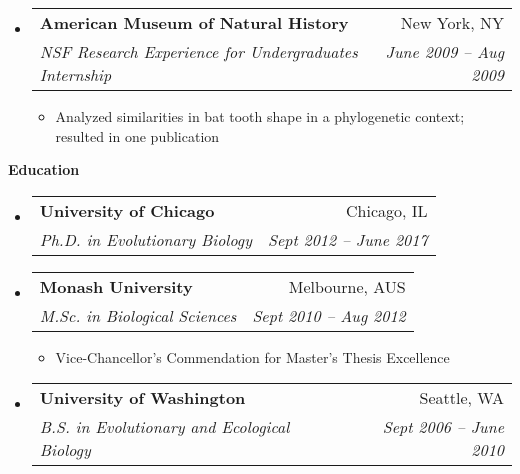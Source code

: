 \documentclass[letterpaper,11pt]{article}
\makeatletter
\newcommand{\resitem}[1]{\item #1 \vspace{-2pt}}
\newcommand{\resheading}[1]{{\large \colorbox{mygrey}{\begin{minipage}{\textwidth}{\textbf{#1 \vphantom{p\^{E}}}}\end{minipage}}}}
\newcommand{\ressubheading}[4]{
\begin{tabular*}{6.5in}{l@{\extracolsep{\fill}}r}
		\textbf{#1} & #2 \\
		\textit{#3} & \textit{#4} \\
\end{tabular*}\vspace{-6pt}}
\makeatother
\begin{document}
\begin{itemize}
    \item 
      \ressubheading{American Museum of Natural History}{New York, NY}{NSF Research Experience for Undergraduates Internship}{June 2009 -- Aug 2009}
        { \footnotesize
        \begin{itemize}
            \resitem{Analyzed similarities in bat tooth shape in a phylogenetic context; resulted in one publication }
        \end{itemize}
        }
	\end{itemize}  %

\resheading{Education}
	\begin{itemize}
		\item
      \ressubheading{University of Chicago}{Chicago, IL}{Ph.D. in Evolutionary Biology}{Sept 2012 -- June 2017}
		\item
      \ressubheading{Monash University}{Melbourne, AUS}{M.Sc. in Biological Sciences}{Sept 2010 -- Aug 2012}
      \begin{itemize}
        \item Vice-Chancellor's Commendation for Master's Thesis Excellence
      \end{itemize}
		\item
      \ressubheading{University of Washington}{Seattle, WA}{B.S. in Evolutionary and Ecological Biology}{Sept 2006 -- June 2010}
	\end{itemize} %
\end{document}
